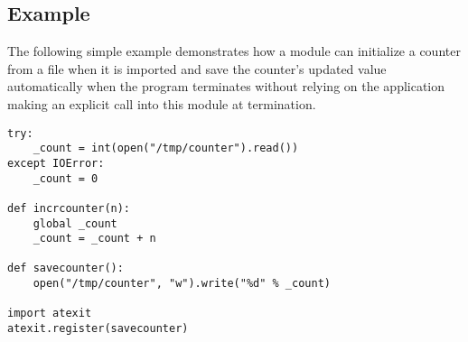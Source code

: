 \subsection{ Example \label{atexit-example}}

The following simple example demonstrates how a module can initialize
a counter from a file when it is imported and save the counter's
updated value automatically when the program terminates without
relying on the application making an explicit call into this module at
termination.

\begin{verbatim}
try:
    _count = int(open("/tmp/counter").read())
except IOError:
    _count = 0

def incrcounter(n):
    global _count
    _count = _count + n

def savecounter():
    open("/tmp/counter", "w").write("%d" % _count)

import atexit
atexit.register(savecounter)
\end{verbatim}
